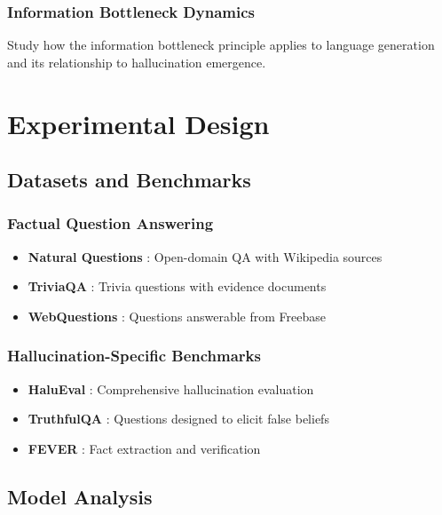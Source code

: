 \subsubsection{Information Bottleneck Dynamics}
Study how the information bottleneck principle applies to language generation and its relationship to hallucination emergence.

\section{Experimental Design}
\label{sec:experiments}

\subsection{Datasets and Benchmarks}
\label{subsec:datasets}

\subsubsection{Factual Question Answering}
\begin{itemize}
    \item \textbf{Natural Questions} \citep{kwiatkowski2019natural}: Open-domain QA with Wikipedia sources
    \item \textbf{TriviaQA} \citep{joshi2017triviaqa}: Trivia questions with evidence documents
    \item \textbf{WebQuestions} \citep{berant2013semantic}: Questions answerable from Freebase
\end{itemize}

\subsubsection{Hallucination-Specific Benchmarks}
\begin{itemize}
    \item \textbf{HaluEval} \citep{li2023halueval}: Comprehensive hallucination evaluation
    \item \textbf{TruthfulQA} \citep{lin2021truthfulqa}: Questions designed to elicit false beliefs
    \item \textbf{FEVER} \citep{thorne2018fever}: Fact extraction and verification
\end{itemize}

\subsection{Model Analysis}
\label{subsec:model_analysis}

